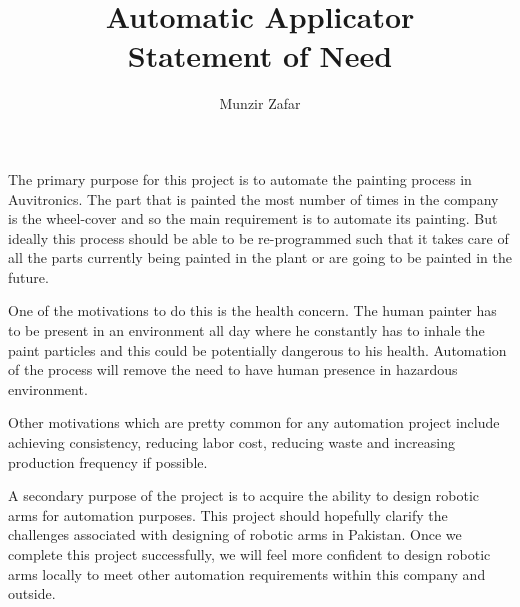\documentclass[a4paper,10pt]{article}
\title{Automatic Applicator\\Statement of Need}
\author{Munzir Zafar}
\begin{document}
\maketitle

The primary purpose for this project is to automate the painting process in Auvitronics. The part that is
painted the most number of times in the company is the wheel-cover and so the main requirement is to 
automate its painting. But ideally this process should be able to be re-programmed such that it takes care of all the parts 
currently being painted in the plant or are going to be painted in the future.

One of the motivations to do this is the health concern. The human painter has to be present in an environment all day where he constantly has to inhale the paint
particles and this could be potentially dangerous to his health. Automation of the process will remove the need to have human 
presence in hazardous environment.

Other motivations which are pretty common for any automation project include achieving consistency, reducing 
labor cost, reducing waste and increasing production frequency if possible.

A secondary purpose of the project is to acquire the ability to design robotic arms for automation purposes.
This project should hopefully clarify the challenges associated with designing of robotic arms in Pakistan.
Once we complete this project successfully, we will feel more confident to design robotic arms locally
to meet other automation requirements within this company and outside.
\end{document}
